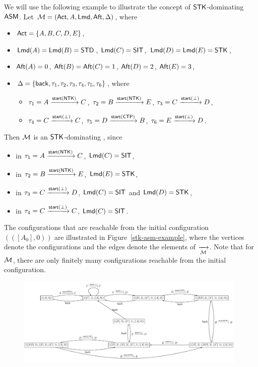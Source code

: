 	\begin{example}
		We will use the following example to illustrate the concept of $\mathsf{STK}$-dominating $\textsf{ASM}$.
		Let ${\mathcal{M} }=({\sf Act},A,{\sf Lmd},{\sf Aft},\Delta)$, where 
		\begin{itemize}
			\item ${\sf Act} = \{A, B, C, D, E\}$, 
			\item ${\sf Lmd}(A)={\sf Lmd}(B)={\sf STD}$, ${\sf Lmd}(C) = {\sf SIT}$, ${\sf Lmd}(D) = {\sf Lmd}(E) = {\sf STK}$, 
			\item ${\sf Aft}(A) = 0$, ${\sf Aft}(B) = {\sf Aft}(C) = 1$, ${\sf Aft}(D) = 2$, ${\sf Aft}(E) = 3$, 
			\item $\Delta = \{{\mathsf{back} },\tau_1, \tau_2, \tau_3, \tau_4, \tau_5, \tau_6\}$, where 
			\begin{itemize}
				\item 	$\tau_1 = A \xrightarrow{{\mathsf{start} }({\sf NTK})} C$,
				$\tau_2 = B \xrightarrow{{\mathsf{start} }({\sf NTK})} E$,
				$\tau_3 = C \xrightarrow{{\mathsf{start} }(\bot)} D$,
				\item		$\tau_4 = C \xrightarrow{{\mathsf{start} }(\bot)} C$,
				$\tau_5 = D \xrightarrow{{\mathsf{start} }({\sf CTP})} B$,
				$\tau_6 = E \xrightarrow{{\mathsf{start} }(\bot)} D$. 
			\end{itemize}
		\end{itemize}
		Then ${\mathcal{M} }$ is an $\mathsf{STK}$-dominating {\AMASS}, since
		\begin{itemize}
			\item in $\tau_1 = A \xrightarrow{{\mathsf{start} }({\sf NTK})} C$, ${\sf Lmd}(C) = {\sf SIT}$,  
			\item in $\tau_2 = B \xrightarrow{{\mathsf{start} }({\sf NTK})} E$, ${\sf Lmd}(E) = {\sf STK}$, 
			\item in $\tau_3 = C \xrightarrow{{\mathsf{start} }(\bot)} D$, ${\sf Lmd}(C) = {\sf SIT}$ and ${\sf Lmd}(D) = {\sf STK}$, 
			\item in $\tau_4 = C \xrightarrow{{\mathsf{start} }(\bot)} C$, ${\sf Lmd}(C) = {\sf SIT}$. 
		\end{itemize}
		The configurations that are reachable from the initial configuration $(([A_0], 0))$ are illustrated in Figure~\ref{stk-asm-example}, where the vertices denote the configurations and the edges denote the elements of $\xrightarrow[{\mathcal{M} }]{}$. 
		Note that for ${\mathcal{M} }$, there are only finitely many configurations reachable from the initial configuration.  
		\begin{figure}[htbp]
			\centering
			\includegraphics[scale = 0.5]{stk-asm-example.pdf}

\end{figure}
\end{example}
